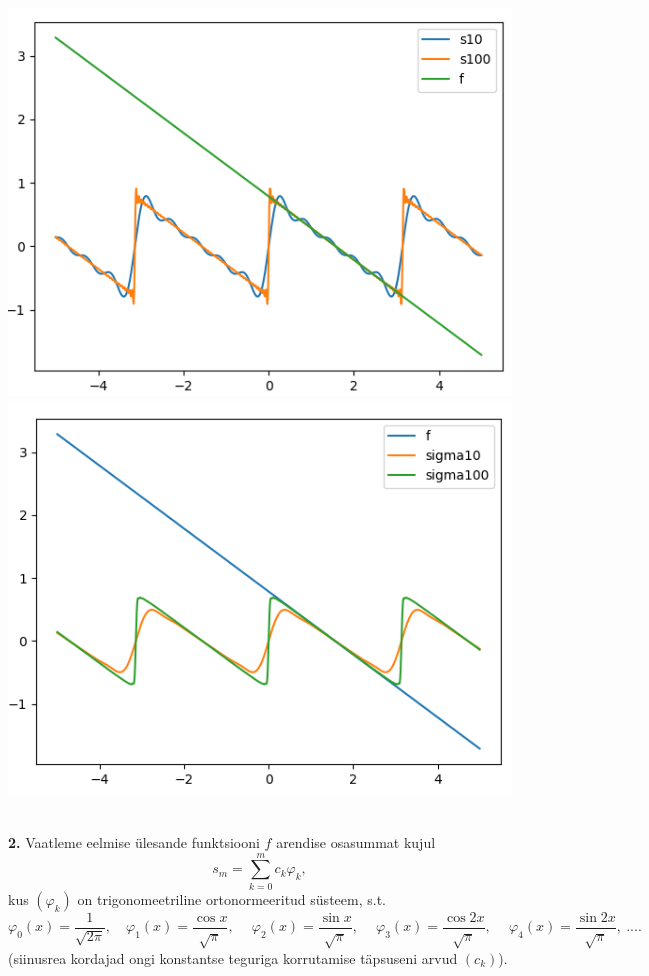 \documentclass{article}
\begin{document}
\begin{center}
\includegraphics[scale=0.4]{graaf1_mma_6.png}
\includegraphics[scale=0.4]{graaf2_mma_6.png}
\end{center}\ 
\pagebreak\\
\textbf{2. } Vaatleme eelmise ülesande funktsiooni $f$ arendise osasummat kujul $$s_m=\sum_{k=0}^mc_k\varphi_k,$$kus $(\varphi_k)$ on trigonomeetriline ortonormeeritud süsteem, s.t. $$\varphi_0(x)=\frac1{\sqrt{2\pi}},\quad\varphi_1(x)=\frac{\cos x}{\sqrt{\pi}},\ \quad\varphi_2(x)=\frac{\sin x}{\sqrt{\pi}},\ \quad\varphi_3(x)=\frac{\cos 2x}{\sqrt{\pi}},\ \quad\varphi_4(x)=\frac{\sin 2x}{\sqrt{\pi}},\ ....$$(siinusrea kordajad ongi konstantse teguriga korrutamise täpsuseni arvud $(c_k)$).\\
\end{document}
